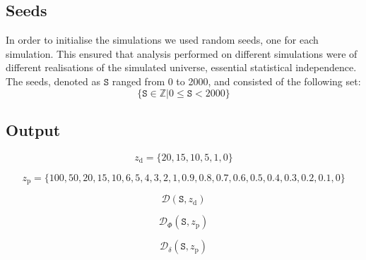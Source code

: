     \subsection{Seeds}
        In order to initialise the simulations we used random seeds, one for each simulation. This ensured that analysis performed on different simulations were of different realisations of the simulated universe, essential statistical independence. The seeds, denoted as $\mathtt{S}$ ranged from 0 to 2000, and consisted of the following set:
        \begin{equation}
            \{\mathtt{S} \in \mathbb{Z} | 0 \leq \mathtt{S} < 2000 \}
        \end{equation}

    \subsection{Output}
        
        \begin{equation}
            z_\mathrm{d} = \{ 20, 15, 10, 5, 1, 0 \}
        \end{equation}

        \begin{equation}
            z_\mathrm{p} = \{ 100,50,20,15,10,6,5,4,3,2,1,0.9,0.8,0.7,0.6,0.5,0.4,0.3,0.2,0.1,0 \}
        \end{equation}

        \begin{equation}
            \mathcal{D}(\mathtt{S}, z_\mathrm{d})
        \end{equation}
        
        \begin{equation}
            \mathcal{D}_\Phi(\mathtt{S}, z_\mathrm{p})
        \end{equation}

        \begin{equation}
            \mathcal{D}_\delta (\mathtt{S}, z_\mathrm{p})
        \end{equation}